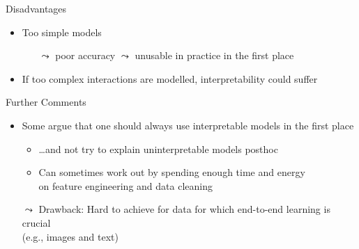 \documentclass[aspectratio=169]{../latex_main/tntbeamer}  %
\begin{document}
\begin{frame}[c]{Disadvantages}

    \begin{itemize}
        \item Too simple models
        \begin{itemize}
            \item[$\leadsto$] poor accuracy $\leadsto$ unusable in practice in the first place
        \end{itemize}
        \pause
        \medskip
        \item If too complex interactions are modelled, interpretability could suffer
    \end{itemize}	
	
\end{frame}

\begin{frame}[c]{Further Comments}

    \begin{itemize}
        \item Some argue that one should always use interpretable models in the first place 
        \begin{itemize}
            \item \ldots and not try to explain uninterpretable models posthoc
            \item Can sometimes work out by spending enough time and energy\\ on feature engineering and data cleaning
        \end{itemize}
        \item[$\leadsto$] Drawback: Hard to achieve for data for which end-to-end learning is crucial\\ (e.g., images and text)
    \end{itemize}	
	
\end{frame}

	
\end{document}
